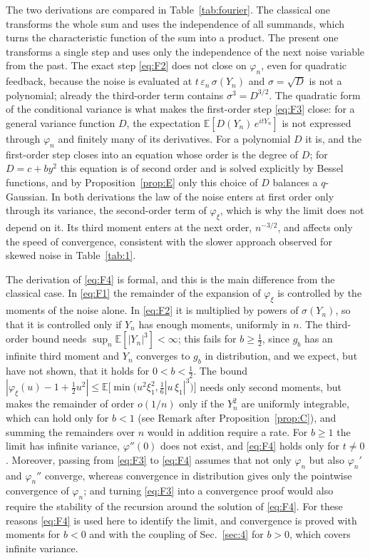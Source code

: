 \documentclass[aip,jmp,preprint,onecolumn,floatfix,superscriptaddress,nofootinbib,11pt]{revtex4-2}
\theoremstyle{plain}
\theoremstyle{remark}
\numberwithin{equation}{section}
\newcommand{\E}{\mathbb{E}}
\newcommand{\eps}{\varepsilon}
\begin{document}
The two derivations are compared in Table~\ref{tab:fourier}. The classical one transforms the whole sum and uses the independence of all summands, which turns the characteristic function of the sum into a product. The present one transforms a single step and uses only the independence of the next noise variable from the past. The exact step \eqref{eq:F2} does not close on $\varphi_n$, even for quadratic feedback, because the noise is evaluated at $t\,\eps_n\,\sigma(Y_n)$ and $\sigma=\sqrt D$ is not a polynomial; already the third-order term contains $\sigma^{3}=D^{3/2}$. The quadratic form of the conditional variance is what makes the first-order step \eqref{eq:F3} close: for a general variance function $D$, the expectation $\E[D(Y_n)\,e^{itY_n}]$ is not expressed through $\varphi_n$ and finitely many of its derivatives. For a polynomial $D$ it is, and the first-order step closes into an equation whose order is the degree of $D$; for $D=c+by^{2}$ this equation is of second order and is solved explicitly by Bessel functions, and by Proposition~\ref{prop:E} only this choice of $D$ balances a $q$-Gaussian. In both derivations the law of the noise enters at first order only through its variance, the second-order term of $\varphi_\xi$, which is why the limit does not depend on it. Its third moment enters at the next order, $n^{-3/2}$, and affects only the speed of convergence, consistent with the slower approach observed for skewed noise in Table~\ref{tab:1}.
 
The derivation of \eqref{eq:F4} is formal, and this is the main difference from the classical case. In \eqref{eq:F1} the remainder of the expansion of $\varphi_\xi$ is controlled by the moments of the noise alone. In \eqref{eq:F2} it is multiplied by powers of $\sigma(Y_n)$, so that it is controlled only if $Y_n$ has enough moments, uniformly in $n$. The third-order bound needs $\sup_n\E[|Y_n|^{3}]<\infty$; this fails for $b\ge\tfrac12$, since $g_b$ has an infinite third moment and $Y_n$ converges to $g_b$ in distribution, and we expect, but have not shown, that it holds for $0<b<\tfrac12$. The bound $|\varphi_\xi(u)-1+\tfrac12u^{2}|\le\E\big[\min\big(u^{2}\xi_1^{2},\tfrac16|u\,\xi_1|^{3}\big)\big]$ needs only second moments, but makes the remainder of order $o(1/n)$ only if the $Y_n^{2}$ are uniformly integrable, which can hold only for $b<1$ (see Remark after Proposition~\ref{prop:C}), and summing the remainders over $n$ would in addition require a rate. For $b\ge1$ the limit has infinite variance, $\varphi''(0)$ does not exist, and \eqref{eq:F4} holds only for $t\ne0$. Moreover, passing from \eqref{eq:F3} to \eqref{eq:F4} assumes that not only $\varphi_n$ but also $\varphi_n'$ and $\varphi_n''$ converge, whereas convergence in distribution gives only the pointwise convergence of $\varphi_n$; and turning \eqref{eq:F3} into a convergence proof would also require the stability of the recursion around the solution of \eqref{eq:F4}. For these reasons \eqref{eq:F4} is used here to identify the limit, and convergence is proved with moments for $b<0$ and with the coupling of Sec.~\ref{sec:4} for $b>0$, which covers infinite variance.
 
\end{document}
